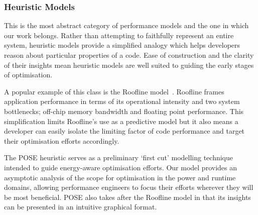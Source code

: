 \subsubsection{Heuristic Models}
This is the most abstract category of performance models and the one in which our work belongs.
Rather than attempting to faithfully represent an entire system, heuristic models provide a simplified analogy which helps developers reason about particular properties of a code.
Ease of construction and the clarity of their insights mean heuristic models are well suited to guiding the early stages of optimisation.

A popular example of this class is the Roofline model~\cite{williams:2009aa}.
Roofline frames application performance in terms of its operational intensity and two system bottlenecks; off-chip memory bandwidth and floating point performance.
This simplification limits Roofline's use as a predictive model but it also means a developer can easily isolate the limiting factor of code performance and target their optimisation efforts accordingly.

The POSE heuristic serves as a preliminary `first cut' modelling technique intended to guide energy-aware optimisation efforts.
Our model provides an asymptotic analysis of the scope for optimisation in the power and runtime domains, allowing performance engineers to focus their efforts wherever they will be most beneficial.
POSE also takes after the Roofline model in that its insights can be presented in an intuitive graphical format.
